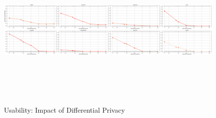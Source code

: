 \clearpage
	\vspace{-5.0in}
\begin{figure}
	\vspace{-6.0in}
	\includegraphics[width=\linewidth, height = 8cm]{Figures/Experiments/Utility/UsabilityDPCompare}
	\vspace{-0.2in}
	\caption[Usability: Impact of Differential Privacy]{Usability: Impact of Differential Privacy}
	\label{fig:usabilitydpcompare}
\end{figure}






